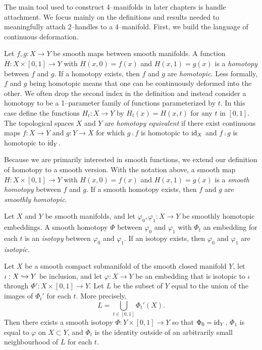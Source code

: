 The main tool used to construct 4--manifolds in later chapters is handle attachment.
We focus mainly on the definitions and results needed to meaningfully attach 2--handles to a 4--manifold.
First, we build the language of continuous deformation.

\begin{defn}
	\label{def:isotopy}
	Let $f,g:X\to Y$ be smooth maps between smooth manifolds.
	A function $H:X\times [0,1]\to Y$ with $H(x,0)=f(x)$ and $H(x,1)=g(x)$ is a \emph{homotopy} between $f$ and $g$.
	If a homotopy exists, then $f$ and $g$ are \emph{homotopic}.
	Less formally, $f$ and $g$ being homotopic means that one can be continuously deformed into the other.
	We often drop the second index in the definition and instead consider a homotopy to be a 1--parameter family of functions parameterized by $t$.
	In this case define the functions $H_t:X\to Y$ by $H_t(x)=H(x,t)$ for any $t$ in $[0,1]$.
	The topological spaces $X$ and $Y$ are \emph{homotopy equivalent} if there exist continuous maps $f:X\to Y$ and $g:Y\to X$ for which $g\comp f$ is homotopic to $\textrm{id}_{X}$ and $f\comp g$ is homotopic to $\textrm{id}_{Y}$.
	
	Because we are primarily interested in smooth functions, we extend our definition of homotopy to a smooth version.
	With the notation above, a smooth map $H:X\times[0,1]\to Y$ with $H(x,0)=f(x)$ and $H(x,1)=g(x)$ is a \emph{smooth homotopy} between $f$ and $g$.
	If a smooth homotopy exists, then $f$ and $g$ are \emph{smoothly homotopic}.
	
	Let $X$ and $Y$ be smooth manifolds, and let $\varphi_0,\varphi_1:X\to Y$ be smoothly homotopic embeddings.
	A smooth homotopy $\Phi$ between $\varphi_0$ and $\varphi_1$ with $\Phi_t$ an embedding for each $t$ is an \emph{isotopy} between $\varphi_0$ and $\varphi_1$.
	If an isotopy exists, then $\varphi_0$ and $\varphi_1$ are \emph{isotopic}.
\end{defn}

\begin{theorem}
	\label{thm:isotopyextension}
	Let $X$ be a smooth compact submanifold of the smooth closed manifold $Y$, let $\iota: X\hookrightarrow Y$ be inclusion, and let $\varphi:X\to Y$ be an embedding that is isotopic to $\iota$ through $\Phi':X\times[0,1]\to Y$.
	Let $L$ be the subset of $Y$ equal to the union of the images of $\Phi_t'$ for each $t$.
	More precisely,
	\[
		L = \bigcup_{t\in[0,1]} \Phi_t'(X).
	\]
	Then there exists a smooth isotopy $\Phi:Y\times[0,1]\to Y$ so that $\Phi_0=\textrm{id}_{Y}$, $\Phi_1$ is equal to $\varphi$ on $X\subset Y$, and $\Phi_t$ is the identity outside of an arbitrarily small neighbourhood of $L$ for each $t$.
\end{theorem}

